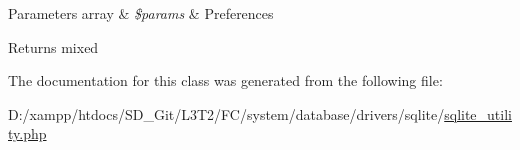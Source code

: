 \begin{DoxyParams}[1]{Parameters}
array & {\em \$params} & Preferences \\
\hline
\end{DoxyParams}
\begin{DoxyReturn}{Returns}
mixed 
\end{DoxyReturn}


The documentation for this class was generated from the following file\+:\begin{DoxyCompactItemize}
\item 
D\+:/xampp/htdocs/\+S\+D\+\_\+\+Git/\+L3\+T2/\+F\+C/system/database/drivers/sqlite/\hyperlink{sqlite__utility_8php}{sqlite\+\_\+utility.\+php}\end{DoxyCompactItemize}

